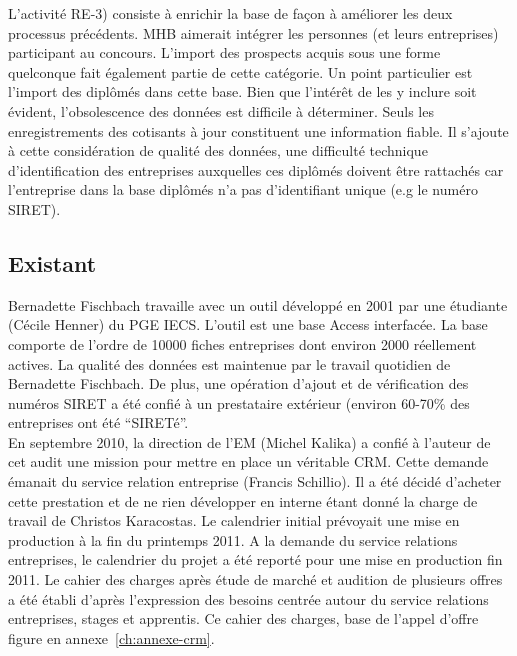 \documentclass{book}
\begin{document}
L'activité RE-3) consiste à enrichir la base de façon à améliorer les deux
processus précédents. MHB aimerait intégrer les personnes (et leurs entreprises)
participant au concours. L'import des prospects acquis sous une forme quelconque
fait également partie de cette catégorie.
Un point particulier est l'import des diplômés dans cette base. Bien que l'intérêt 
de les y inclure soit évident, l'obsolescence des données est difficile à déterminer.
Seuls les enregistrements des cotisants à jour constituent une information fiable.
Il s'ajoute à cette considération de qualité des données, une difficulté technique
d'identification des entreprises auxquelles ces diplômés doivent être rattachés car
l'entreprise dans la base diplômés n'a pas d'identifiant unique (e.g le numéro SIRET).



\subsection{Existant}

Bernadette Fischbach travaille avec un outil développé en 2001 par 
une étudiante (Cécile Henner) du PGE IECS. L'outil est une base 
Access interfacée. La base comporte de l'ordre de 10000 fiches 
entreprises dont environ 2000 réellement actives. La qualité
des données est maintenue par le travail quotidien de Bernadette
Fischbach. De plus, une opération d'ajout et de vérification des
numéros SIRET a été confié à un prestataire extérieur (environ
60-70\% des entreprises ont été ``SIRETé''.\\

En septembre 2010, la direction de l'EM (Michel Kalika) a confié
à l'auteur de cet audit une mission pour mettre en place un véritable
CRM. Cette demande émanait du service relation entreprise (Francis 
Schillio). Il a été décidé d'acheter cette prestation et de ne rien 
développer en interne étant donné la charge de travail de Christos 
Karacostas. Le calendrier initial prévoyait une mise en production 
à la fin du printemps 2011. A la demande du service relations 
entreprises, le calendrier du projet a été reporté pour une mise en 
production fin 2011.
Le cahier des charges après étude de marché et audition de
plusieurs offres a été établi d'après l'expression des besoins
centrée autour du service relations entreprises, stages et apprentis.
Ce cahier des charges, base de l'appel d'offre figure en 
annexe~\ref{ch:annexe-crm}.\\
\end{document}
